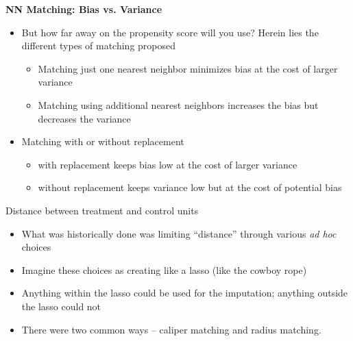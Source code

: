 \documentclass{beamer}
\begin{document}
\begin{frame}[plain]
	
	\begin{center}
	\textbf{NN Matching: Bias vs. Variance}
	\end{center}
	
	\begin{itemize}
	\item But how far away on the propensity score will you use? Herein lies the different types of matching proposed
		\begin{itemize}
		\item Matching just one nearest neighbor minimizes bias at the cost of larger variance
		\item Matching using additional nearest neighbors increases the bias but decreases the variance
		\end{itemize}
	\item Matching with or without replacement
		\begin{itemize}
		\item with replacement keeps bias low at the cost of larger variance
		\item without replacement keeps variance low but at the cost of potential bias
		\end{itemize}
	\end{itemize}
	
\end{frame}


\begin{frame}{Distance between treatment and control units}

\begin{itemize}
\item What was historically done was limiting ``distance''  through various \emph{ad hoc} choices
\item Imagine these choices as creating like a lasso (like the cowboy rope)
\item Anything within the lasso could be used for the imputation; anything outside the lasso could not
\item There were two common ways -- caliper matching and radius matching. 
\end{itemize}

\end{frame}
\end{document}
